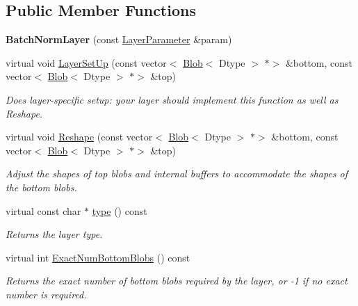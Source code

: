 \subsection*{Public Member Functions}
\begin{DoxyCompactItemize}
\item 
\mbox{\label{classcaffe_1_1_batch_norm_layer_add0e20ed67cad3052669765cda52a7f0}} 
{\bfseries Batch\+Norm\+Layer} (const \mbox{\hyperlink{classcaffe_1_1_layer_parameter}{Layer\+Parameter}} \&param)
\item 
virtual void \mbox{\hyperlink{classcaffe_1_1_batch_norm_layer_a259d8b26c05450339b33ad024f356b6a}{Layer\+Set\+Up}} (const vector$<$ \mbox{\hyperlink{classcaffe_1_1_blob}{Blob}}$<$ Dtype $>$ $\ast$$>$ \&bottom, const vector$<$ \mbox{\hyperlink{classcaffe_1_1_blob}{Blob}}$<$ Dtype $>$ $\ast$$>$ \&top)
\begin{DoxyCompactList}\small\item\em Does layer-\/specific setup\+: your layer should implement this function as well as Reshape. \end{DoxyCompactList}\item 
virtual void \mbox{\hyperlink{classcaffe_1_1_batch_norm_layer_a1acd542fe8fe89d88db9050d048fc7d2}{Reshape}} (const vector$<$ \mbox{\hyperlink{classcaffe_1_1_blob}{Blob}}$<$ Dtype $>$ $\ast$$>$ \&bottom, const vector$<$ \mbox{\hyperlink{classcaffe_1_1_blob}{Blob}}$<$ Dtype $>$ $\ast$$>$ \&top)
\begin{DoxyCompactList}\small\item\em Adjust the shapes of top blobs and internal buffers to accommodate the shapes of the bottom blobs. \end{DoxyCompactList}\item 
\mbox{\label{classcaffe_1_1_batch_norm_layer_a58c9860015d3527ba1df35520a9d9cfc}} 
virtual const char $\ast$ \mbox{\hyperlink{classcaffe_1_1_batch_norm_layer_a58c9860015d3527ba1df35520a9d9cfc}{type}} () const
\begin{DoxyCompactList}\small\item\em Returns the layer type. \end{DoxyCompactList}\item 
virtual int \mbox{\hyperlink{classcaffe_1_1_batch_norm_layer_a5b87980f25eea544ebff916586c870e6}{Exact\+Num\+Bottom\+Blobs}} () const
\begin{DoxyCompactList}\small\item\em Returns the exact number of bottom blobs required by the layer, or -\/1 if no exact number is required. \end{DoxyCompactList}\item 

\end{DoxyCompactItemize}
